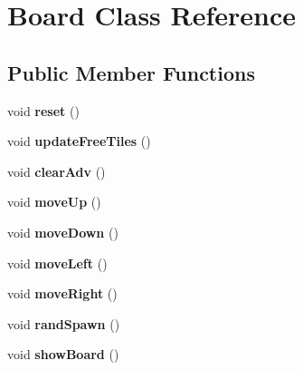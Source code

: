 \hypertarget{classBoard}{\section{Board Class Reference}
\label{classBoard}
}
\subsection*{Public Member Functions}
\begin{DoxyCompactItemize}
\item 
\hypertarget{classBoard_aaef819a8d1a10c35d9f802195802236e}{void {\bfseries reset} ()}\label{classBoard_aaef819a8d1a10c35d9f802195802236e}

\item 
\hypertarget{classBoard_afcd4fcf5cbe57ff612f43a3fcb9a336f}{void {\bfseries update\-Free\-Tiles} ()}\label{classBoard_afcd4fcf5cbe57ff612f43a3fcb9a336f}

\item 
\hypertarget{classBoard_a43d0ddf4bb8fb210425cb3e3d335ee91}{void {\bfseries clear\-Adv} ()}\label{classBoard_a43d0ddf4bb8fb210425cb3e3d335ee91}

\item 
\hypertarget{classBoard_a767dee32f9ceb1f7d83bdd75e4b3564b}{void {\bfseries move\-Up} ()}\label{classBoard_a767dee32f9ceb1f7d83bdd75e4b3564b}

\item 
\hypertarget{classBoard_a37e2291db8ee17dd063bc858e97043d4}{void {\bfseries move\-Down} ()}\label{classBoard_a37e2291db8ee17dd063bc858e97043d4}

\item 
\hypertarget{classBoard_a331b8563869f8ddd6a086f7b254f91ba}{void {\bfseries move\-Left} ()}\label{classBoard_a331b8563869f8ddd6a086f7b254f91ba}

\item 
\hypertarget{classBoard_a9587b11000f09b594bc005f85354fa70}{void {\bfseries move\-Right} ()}\label{classBoard_a9587b11000f09b594bc005f85354fa70}

\item 
\hypertarget{classBoard_a292092da6bf7e9d034a253b8badb29ec}{void {\bfseries rand\-Spawn} ()}\label{classBoard_a292092da6bf7e9d034a253b8badb29ec}

\item 
\hypertarget{classBoard_a4c7d8fa323cbc2163d9375bbf52e8b07}{void {\bfseries show\-Board} ()}\label{classBoard_a4c7d8fa323cbc2163d9375bbf52e8b07}

\end{DoxyCompactItemize}

